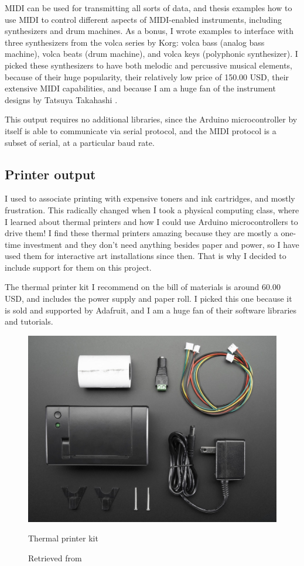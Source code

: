 MIDI can be used for transmitting all sorts of data, and thesis examples how to use MIDI to control different aspects of MIDI-enabled instruments, including synthesizers and drum machines. As a bonus, I wrote examples to interface with three synthesizers from the volca series by Korg: volca bass (analog bass machine), volca beats (drum machine), and volca keys (polyphonic synthesizer). I picked these synthesizers to have both melodic and percussive musical elements, because of their huge popularity, their relatively low price of 150.00 USD, their extensive MIDI capabilities, and because I am a huge fan of the instrument designs by Tatsuya Takahashi \cite{website-tatsuya-takahashi}.

This output requires no additional libraries, since the Arduino microcontroller by itself is able to communicate via serial protocol, and the MIDI protocol is a subset of serial, at a particular \gls{baud} rate.

\subsection{Printer output}

I used to associate printing with expensive toners and ink cartridges, and mostly frustration. This radically changed when I took a physical computing class, where I learned about thermal printers and how I could use Arduino microcontrollers to drive them! I find these thermal printers amazing because they are mostly a one-time investment and they don't need anything besides paper and power, so I have used them for interactive art installations since then. That is why I decided to include support for them on this project.

The thermal printer kit I recommend on the bill of materials is around 60.00 USD, and includes the power supply and paper roll. I picked this one because it is sold and supported by Adafruit, and I am a huge fan of their software libraries and tutorials. 

\begin{figure}[ht]
  \centering
  \includegraphics[width=0.75\linewidth,height=0.25\textheight,keepaspectratio]{images/materials-adafruit-thermal-printer.jpg}
  \caption{Thermal printer kit}
  \caption*{Retrieved from \cite{website-materials-adafruit-thermal-printer}}
  \label{fig:materials-adafruit-thermal-printer}
\end{figure}


